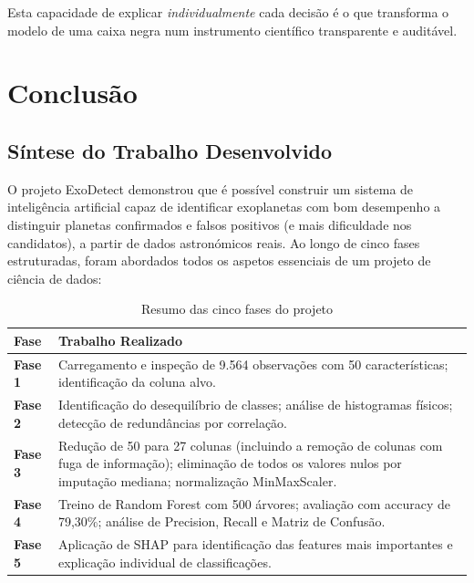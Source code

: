 \documentclass[12pt, a4paper]{report}
\begin{document}
Esta capacidade de explicar \textit{individualmente} cada decisão é o que transforma o modelo de uma caixa negra num instrumento científico transparente e auditável.

\chapter{Conclusão}

\section{Síntese do Trabalho Desenvolvido}

O projeto ExoDetect demonstrou que é possível construir um sistema de inteligência artificial capaz de identificar exoplanetas com bom desempenho a distinguir planetas confirmados e falsos positivos (e mais dificuldade nos candidatos), a partir de dados astronómicos reais. Ao longo de cinco fases estruturadas, foram abordados todos os aspetos essenciais de um projeto de ciência de dados:

\begin{table}[h]
\centering
\caption{Resumo das cinco fases do projeto}
\begin{tabular}{>{\bfseries}p{}p{}}
\toprule
Fase & Trabalho Realizado \\
\midrule
Fase 1 & Carregamento e inspeção de 9.564 observações com 50 características; identificação da coluna alvo. \\
\addlinespace
Fase 2 & Identificação do desequilíbrio de classes; análise de histogramas físicos; detecção de redundâncias por correlação. \\
\addlinespace
Fase 3 & Redução de 50 para 27 colunas (incluindo a remoção de colunas com fuga de informação); eliminação de todos os valores nulos por imputação mediana; normalização MinMaxScaler. \\
\addlinespace
Fase 4 & Treino de Random Forest com 500 árvores; avaliação com accuracy de 79,30\%; análise de Precision, Recall e Matriz de Confusão. \\
\addlinespace
Fase 5 & Aplicação de SHAP para identificação das features mais importantes e explicação individual de classificações. \\
\bottomrule
\end{tabular}
\end{table}
\end{document}
